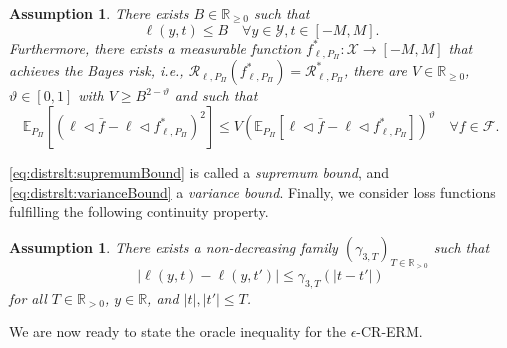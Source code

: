 \documentclass[letterpaper]{article} %
\newcommand{\R}{\mathbb{R}}
\newcommand{\Rnn}{\R_{\geq 0}}
\newcommand{\Rp}{\R_{> 0}}
\newcommand{\E}{\mathbb{E}}
\newcommand{\inputSet}{\mathcal{X}} %
\newcommand{\outputSet}{\mathcal{Y}} %
\newcommand{\risk}{\mathcal{R}} %
\newcommand{\Risk}[2]{\risk_{{#1},{#2}}} %
\newcommand{\RiskBayes}[2]{\risk_{{#1},{#2}}^\ast} %
\newcommand{\hilbertianEmbed}{\Pi} %
\newcommand{\pipe}{\lhd}
\newcommand{\clipped}[1]{\bar{#1}}
\newcommand{\defm}[1]{\emph{#1}}
\newtheorem{assumption}[theorem]{Assumption}
\begin{document}
\begin{assumption} \label{assumption:distrslt:supremumAndVarianceBound}
There exists $B\in\Rnn$ such that
\begin{equation} \label{eq:distrslt:supremumBound}
    \ell(y,t) \leq B \quad \forall y \in \outputSet, t \in [-M,M].
\end{equation}
Furthermore, there exists a measurable function $f_{\ell,P_\hilbertianEmbed}^\ast: \inputSet\rightarrow [-M,M]$ that achieves the Bayes risk,
i.e., $\Risk{\ell}{P_\hilbertianEmbed}(f_{\ell,P_\hilbertianEmbed}^\ast)=\RiskBayes{\ell}{P_\Pi}$,
there are $V\in\Rnn$, $\vartheta\in[0,1]$ with $V \geq B^{2-\vartheta}$ and such that
\begin{equation} \label{eq:distrslt:varianceBound}
    \E_{P_\hilbertianEmbed}\left[\left(\ell \pipe \clipped{f} - \ell \pipe f_{\ell,P_\hilbertianEmbed}^\ast \right)^2 \right]
    \leq
    V \left(\E_{P_\hilbertianEmbed}\left[\ell \pipe \clipped{f} - \ell \pipe f_{\ell,P_\hilbertianEmbed}^\ast \right]\right)^\vartheta
    \quad
    \forall f \in \mathcal{F}.
\end{equation}
\end{assumption}
\eqref{eq:distrslt:supremumBound} is called a \defm{supremum bound}, and \eqref{eq:distrslt:varianceBound} a \defm{variance bound}.
Finally, we consider loss functions fulfilling the following continuity property.
\begin{assumption} \label{assumption:distrslt:continuityOfLoss}
    There exists a non-decreasing family $(\gamma_{3,T})_{T\in\Rp}$ such that
    \begin{equation}
        |\ell(y,t) - \ell(y,t')| \leq \gamma_{3,T}(|t-t'|)
    \end{equation}
    for all $T\in\Rp$, $y\in \R$, and $|t|,|t'|\leq T$.
\end{assumption}
We are now ready to state the oracle inequality for the $\epsilon$-CR-ERM.
\end{document}
